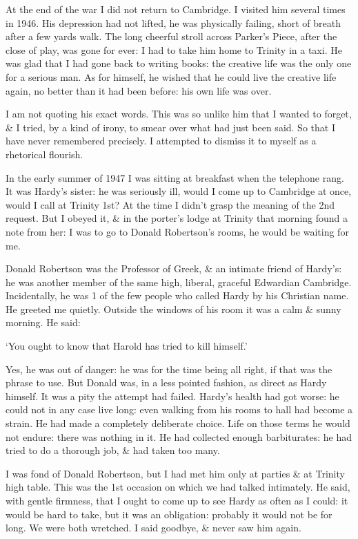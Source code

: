 \documentclass{article}
\numberwithin{equation}{section}
\begin{document}
At the end of the war I did not return to Cambridge. I visited him several times in 1946. His depression had not lifted, he was physically failing, short of breath after a few yards walk. The long cheerful stroll across Parker's Piece, after the close of play, was gone for ever: I had to take him home to Trinity in a taxi. He was glad that I had gone back to writing books: the creative life was the only one for a serious man. As for himself, he wished that he could live the creative life again, no better than it had been before: his own life was over.

I am not quoting his exact words. This was so unlike him that I wanted to forget, \& I tried, by a kind of irony, to smear over what had just been said. So that I have never remembered precisely. I attempted to dismiss it to myself as a rhetorical flourish.

In the early summer of 1947 I was sitting at breakfast when the telephone rang. It was Hardy's sister: he was seriously ill, would I come up to Cambridge at once, would I call at Trinity 1st? At the time I didn't grasp the meaning of the 2nd request. But I obeyed it, \& in the porter's lodge at Trinity that morning found a note from her: I was to go to Donald Robertson's rooms, he would be waiting for me.

Donald Robertson was the Professor of Greek, \& an intimate friend of Hardy's: he was another member of the same high, liberal, graceful Edwardian Cambridge. Incidentally, he was 1 of the few people who called Hardy by his Christian name. He greeted me quietly. Outside the windows of his room it was a calm \& sunny morning. He said:

`You ought to know that Harold has tried to kill himself.'

Yes, he was out of danger: he was for the time being all right, if that was the phrase to use. But Donald was, in a less pointed fashion, as direct as Hardy himself. It was a pity the attempt had failed. Hardy's health had got worse: he could not in any case live long: even walking from his rooms to hall had become a strain. He had made a completely deliberate choice. Life on those terms he would not endure: there was nothing in it. He had collected enough barbiturates: he had tried to do a thorough job, \& had taken too many.

I was fond of Donald Robertson, but I had met him only at parties \& at Trinity high table. This was the 1st occasion on which we had talked intimately. He said, with gentle firmness, that I ought to come up to see Hardy as often as I could: it would be hard to take, but it was an obligation: probably it would not be for long. We were both wretched. I said goodbye, \& never saw him again.
\end{document}
